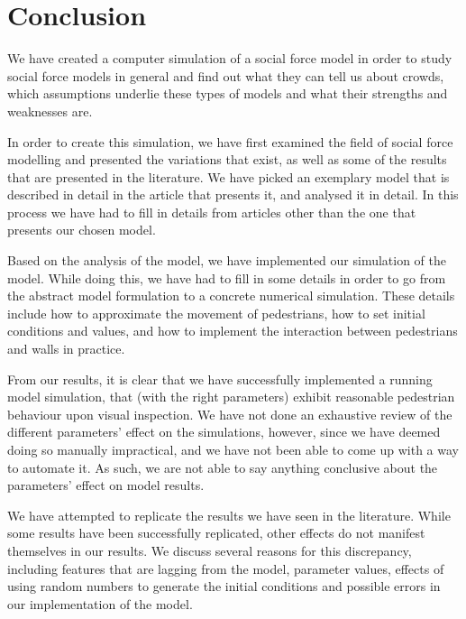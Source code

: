 \section{Conclusion}
\label{sec:conclusion}

We have created a computer simulation of a social force model in order to 
study social force models in general and find out what they can tell us about 
crowds, which assumptions underlie these types of models and what their 
strengths and weaknesses are.

In order to create this simulation, we have first examined the field of social 
force modelling and presented the variations that exist, as well as some of 
the results that are presented in the literature. We have picked an exemplary 
model that is described in detail in the article that presents it, and 
analysed it in detail. In this process we have had to fill in details from 
articles other than the one that presents our chosen model.

Based on the analysis of the model, we have implemented our simulation of the 
model. While doing this, we have had to fill in some details in order to go 
from the abstract model formulation to a concrete numerical simulation. These 
details include how to approximate the movement of pedestrians, how to set 
initial conditions and values, and how to implement the interaction between 
pedestrians and walls in practice.

From our results, it is clear that we have successfully implemented a running 
model simulation, that (with the right parameters) exhibit reasonable 
pedestrian behaviour upon visual inspection. We have not done an exhaustive 
review of the different parameters' effect on the simulations, however, since 
we have deemed doing so manually impractical, and we have not been able to 
come up with a way to automate it. As such, we are not able to say anything 
conclusive about the parameters' effect on model results.

We have attempted to replicate the results we have seen in the literature.  
While some results have been successfully replicated, other effects do not 
manifest themselves in our results. We discuss several reasons for this 
discrepancy, including features that are lagging from the model, parameter 
values, effects of using random numbers to generate the initial conditions and 
possible errors in our implementation of the model.

